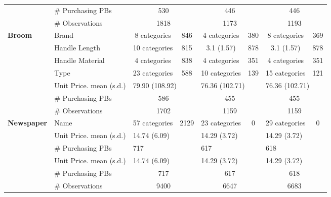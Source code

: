 \begin{longtable}{llccccccccc}
 \nopagebreak & \# Purchasing PBs & \multicolumn{3}{c}{530} & \multicolumn{3}{c}{446} & \multicolumn{3}{c}{446} \\* 
 \nopagebreak & \# Observations & \multicolumn{3}{c}{1818} & \multicolumn{3}{c}{1173} & \multicolumn{3}{c}{1193} \\* 
 \midrule 
 \multirow{7}{*}{\textbf{Broom}} & Brand & \multicolumn{2}{c}{8 categories} & 846 & \multicolumn{2}{c}{4 categories} & 380 & \multicolumn{2}{c}{8 categories} & 369 \\* 
 & Handle Length & \multicolumn{2}{c}{10 categories} & 815 & \multicolumn{2}{c}{3.1 (1.57)} & 878 & \multicolumn{2}{c}{3.1 (1.57)} & 878 \\* 
 & Handle Material & \multicolumn{2}{c}{4 categories} & 838 & \multicolumn{2}{c}{4 categories} & 351 & \multicolumn{2}{c}{4 categories} & 351 \\* 
 & Type & \multicolumn{2}{c}{23 categories} & 588 & \multicolumn{2}{c}{10 categories} & 139 & \multicolumn{2}{c}{15 categories} & 121 \\* 
 \nopagebreak \cmidrule{2-11} 
 \nopagebreak & Unit Price. mean (s.d.) & \multicolumn{3}{l}{79.90 (108.92)} & \multicolumn{3}{l}{76.36 (102.71)} & \multicolumn{3}{l}{76.36 (102.71)} \\* 
 \nopagebreak & \# Purchasing PBs & \multicolumn{3}{c}{586} & \multicolumn{3}{c}{455} & \multicolumn{3}{c}{455} \\* 
 \nopagebreak & \# Observations & \multicolumn{3}{c}{1702} & \multicolumn{3}{c}{1159} & \multicolumn{3}{c}{1159} \\* 
 \midrule 
 \multirow{6}{*}{\textbf{Newspaper}} & Name & \multicolumn{2}{c}{57 categories} & 2129 & \multicolumn{2}{c}{23 categories} & 0 & \multicolumn{2}{c}{29 categories} & 0 \\* 
 \nopagebreak \cmidrule{2-11} 
 & Unit Price. mean (s.d.) & \multicolumn{3}{l}{14.74 (6.09)} & \multicolumn{3}{l}{14.29 (3.72)} & \multicolumn{3}{l}{14.29 (3.72)} \\* 
 & \# Purchasing PBs & \multicolumn{3}{l}{717} & \multicolumn{3}{l}{617} & \multicolumn{3}{l}{618} \\* 
 \nopagebreak & Unit Price. mean (s.d.) & \multicolumn{3}{l}{14.74 (6.09)} & \multicolumn{3}{l}{14.29 (3.72)} & \multicolumn{3}{l}{14.29 (3.72)} \\* 
 \nopagebreak & \# Purchasing PBs & \multicolumn{3}{c}{717} & \multicolumn{3}{c}{617} & \multicolumn{3}{c}{618} \\* 
 \nopagebreak & \# Observations & \multicolumn{3}{c}{9400} & \multicolumn{3}{c}{6647} & \multicolumn{3}{c}{6683} \\* 

\end{longtable}
